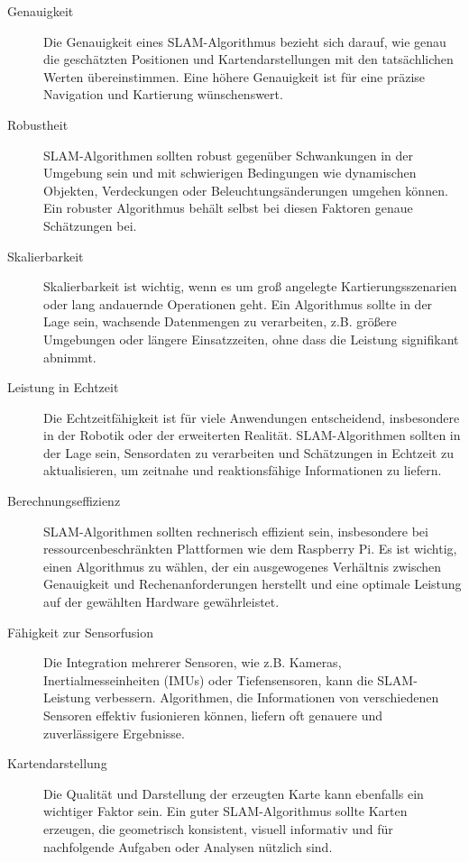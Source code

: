 \begin{description}
    \item[Genauigkeit]{Die Genauigkeit eines \ac{SLAM}-Algorithmus bezieht sich darauf, wie genau die geschätzten Positionen und Kartendarstellungen mit den tatsächlichen Werten übereinstimmen. Eine höhere Genauigkeit ist für eine präzise Navigation und Kartierung wünschenswert.}
    \item[Robustheit]{\ac{SLAM}-Algorithmen sollten robust gegenüber Schwankungen in der Umgebung sein und mit schwierigen Bedingungen wie dynamischen Objekten, Verdeckungen oder Beleuchtungsänderungen umgehen können. Ein robuster Algorithmus behält selbst bei diesen Faktoren genaue Schätzungen bei.} 
    \item[Skalierbarkeit]{Skalierbarkeit ist wichtig, wenn es um groß angelegte Kartierungsszenarien oder lang andauernde Operationen geht. Ein Algorithmus sollte in der Lage sein, wachsende Datenmengen zu verarbeiten, z.B. größere Umgebungen oder längere Einsatzzeiten, ohne dass die Leistung signifikant abnimmt.}
    \item[Leistung in Echtzeit]{Die Echtzeitfähigkeit ist für viele Anwendungen entscheidend, insbesondere in der Robotik oder der erweiterten Realität. \ac{SLAM}-Algorithmen sollten in der Lage sein, Sensordaten zu verarbeiten und Schätzungen in Echtzeit zu aktualisieren, um zeitnahe und reaktionsfähige Informationen zu liefern.}
    \item[Berechnungseffizienz]{\ac{SLAM}-Algorithmen sollten rechnerisch effizient sein, insbesondere bei ressourcenbeschränkten Plattformen wie dem Raspberry Pi. Es ist wichtig, einen Algorithmus zu wählen, der ein ausgewogenes Verhältnis zwischen Genauigkeit und Rechenanforderungen herstellt und eine optimale Leistung auf der gewählten Hardware gewährleistet.}
    \item[Fähigkeit zur Sensorfusion]{Die Integration mehrerer Sensoren, wie z.B. Kameras, Inertialmesseinheiten (IMUs) oder Tiefensensoren, kann die \ac{SLAM}-Leistung verbessern. Algorithmen, die Informationen von verschiedenen Sensoren effektiv fusionieren können, liefern oft genauere und zuverlässigere Ergebnisse.}
    \item[Kartendarstellung]{Die Qualität und Darstellung der erzeugten Karte kann ebenfalls ein wichtiger Faktor sein. Ein guter \ac{SLAM}-Algorithmus sollte Karten erzeugen, die geometrisch konsistent, visuell informativ und für nachfolgende Aufgaben oder Analysen nützlich sind.} 
\end{description}

